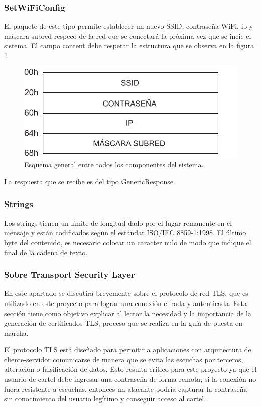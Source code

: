 \subsubsection{SetWiFiConfig}

El paquete de este tipo permite establecer un nuevo SSID, contraseña WiFi, ip y máscara subred respeco de la red que se conectará la próxima vez que se incie el sistema.
El campo content debe respetar la estructura que se observa en la figura \ref{fig:paquete-wifi}


\begin{figure}[!ht]
	\centering
	\includegraphics[width=0.5\linewidth]{imagenes/protocolo/paquete-wifi.pdf}
	\caption{Esquema general entre todos los componentes del sistema.}
	\label{fig:paquete-wifi}
\end{figure}

La respuesta que se recibe es del tipo GenericResponse.


\subsubsection{Strings}

Los strings tienen un límite de longitud dado por el lugar remanente en el mensaje y están codificados según el estándar ISO/IEC 8859-1:1998.
El último byte del contenido, es necesario colocar un caracter nulo de modo que indique el final de la cadena de texto.


\subsubsection{Sobre Transport Security Layer}\label{sec:tls}
En este apartado se discutirá brevemente sobre el protocolo de red TLS, que es utilizado en este proyecto para lograr una conexión cifrada y autenticada. Esta sección tiene como objetivo explicar al lector la necesidad y la importancia de la generación de certificados TLS, proceso que se realiza en la guía de puesta en marcha.

El protocolo TLS está diseñado para permitir a aplicaciones con arquitectura de cliente-servidor comunicarse de manera que se evita las escuchas por terceros, alteración o falsificación de datos\cite{TLS}. Esto resulta crítico para este proyecto ya que el usuario de cartel debe ingresar una contraseña de forma remota; si la conexión no fuera resistente a escuchas, entonces un atacante podría capturar la contraseña sin conocimiento del usuario legítimo y conseguir acceso al cartel.

